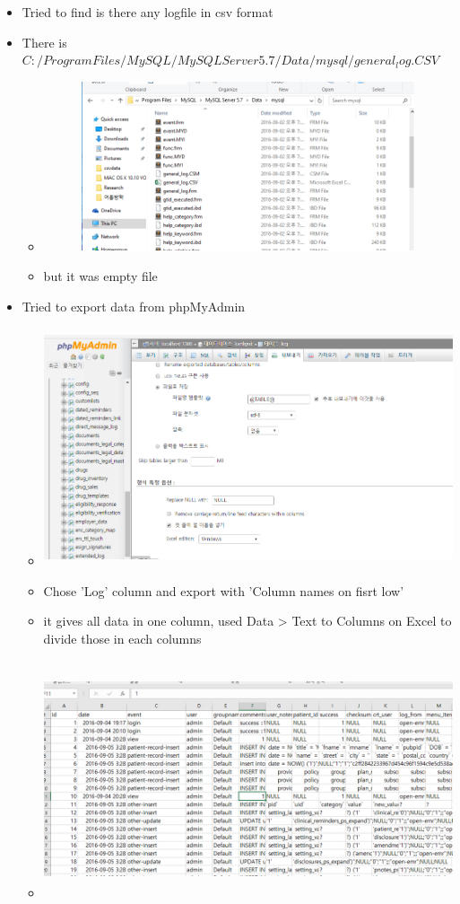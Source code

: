 \documentclass[paper=a4, fontsize=11pt]{scrartcl} %
\numberwithin{equation}{section} %
\numberwithin{figure}{section} %
\numberwithin{table}{section} %
\begin{document}
\begin{itemize}
	\item Tried to find is there any logfile in csv format
	\item There is $C:/Program Files/MySQL/MySQL Server 5.7/Data/mysql/general_log.CSV$
		\begin{itemize}
		\item
		 \includegraphics[width = 20cm, height=5cm]{pictures/Emptylogfile.png}
		\end{itemize}
		\begin{itemize}
		\item but it was empty file
		\end{itemize}
	\item Tried to export data from phpMyAdmin
		\begin{itemize}
		\item
		 \includegraphics[width = 20cm, height=7cm]{pictures/phpmyadminexport.png}
		\item Chose 'Log' column and export with 'Column names on fisrt low'
		\item it gives all data in one column, used  Data > Text to Columns on Excel to divide those in each columns
		\item
		 \includegraphics[width = 20cm, height=7cm]{pictures/logfileincsv.png}

\end{itemize}
\end{itemize}
\end{document}
